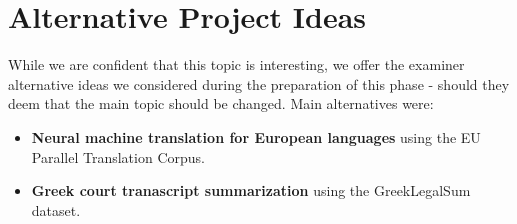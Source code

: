 \section{Alternative Project Ideas}
\label{sec:alt_pj}

While we are confident that this topic is interesting, we offer the examiner alternative ideas we considered during the preparation of this phase - should they deem that the main topic should be changed. Main alternatives were:

\begin{itemize}
    \item \textbf{Neural machine translation for European languages} using the EU Parallel Translation Corpus\cite{eucorpus}.
    \item \textbf{Greek court tranascript summarization} using the GreekLegalSum\cite{grcourt} dataset.
\end{itemize}